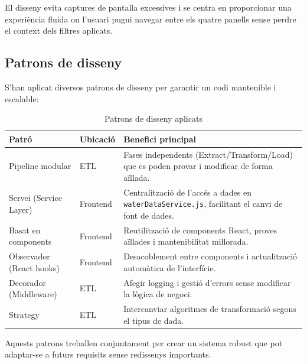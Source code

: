 El disseny evita captures de pantalla excessives i se centra en proporcionar una experiència fluida on l'usuari pugui navegar entre els quatre panells sense perdre el context dels filtres aplicats.


\subsection{Patrons de disseny}

S'han aplicat diversos patrons de disseny per garantir un codi mantenible i escalable:

\begin{table}[h]
\centering
\caption{Patrons de disseny aplicats}
\begin{tabular}{|l|l|p{6cm}|}
\hline
\textbf{Patró} & \textbf{Ubicació} & \textbf{Benefici principal} \\
\hline
Pipeline modular & ETL & Fases independents (Extract/Transform/Load) que es poden provar i modificar de forma aïllada. \\
\hline
Servei (Service Layer) & Frontend & Centralització de l'accés a dades en \texttt{waterDataService.js}, facilitant el canvi de font de dades. \\
\hline
Basat en components & Frontend & Reutilització de components React, proves aïllades i mantenibilitat millorada. \\
\hline
Observador (React hooks) & Frontend & Desacoblement entre components i actualització automàtica de l'interfície. \\
\hline
Decorador (Middleware) & ETL & Afegir logging i gestió d'errors sense modificar la lògica de negoci. \\
\hline
Strategy & ETL & Intercanviar algoritmes de transformació segons el tipus de dada. \\
\hline
\end{tabular}
\end{table}

Aquests patrons treballen conjuntament per crear un sistema robust que pot adaptar-se a futurs requisits sense redissenys importants.
